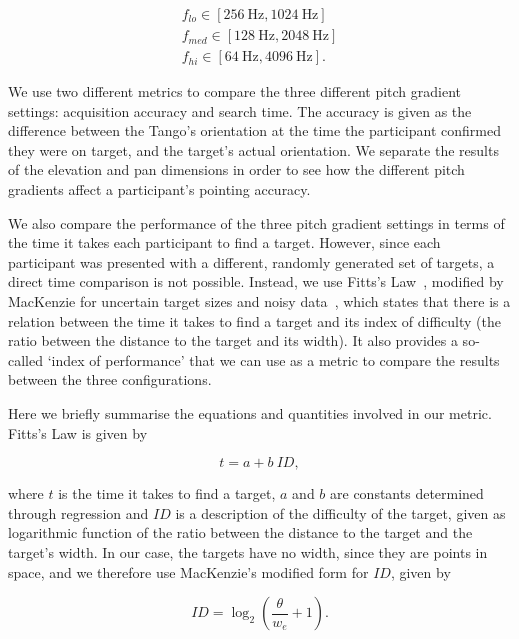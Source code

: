 \documentclass[acmsmall]{acmart}
\begin{document}
\begin{gather*}
  f_{lo}\in[\SI{256}{\hertz}, \SI{1024}{\hertz}]\\
  f_{med}\in[\SI{128}{\hertz}, \SI{2048}{\hertz}]\\
  f_{hi}\in[\SI{64}{\hertz}, \SI{4096}{\hertz}].
\end{gather*}

We use two different metrics to compare the three different pitch gradient settings: acquisition accuracy and search time.
The accuracy is given as the difference between the Tango's orientation at the time the participant confirmed they were on target, and the target's actual orientation.
We separate the results of the elevation and pan dimensions in order to see how the different pitch gradients affect a participant's pointing accuracy. 

We also compare the performance of the three pitch gradient settings in terms of the time it takes each participant to find a target.
However, since each participant was presented with a different, randomly generated set of targets, a direct time comparison is not possible.
Instead, we use Fitts's Law~\citep{fitts1954information}, modified by MacKenzie for uncertain target sizes and noisy data~\citep{mackenzie1992fitts}, which states that there is a relation between the time it takes to find a target and its index of difficulty (the ratio between the distance to the target and its width).
It also provides a so-called `index of performance' that we can use as a metric to compare the results between the three configurations. 

Here we briefly summarise the equations and quantities involved in our metric.
Fitts's Law is given by  

\begin{equation}
  \label{eq:fitts-base}
  t = a + b~ID,
\end{equation}

\noindent
where $t$ is the time it takes to find a target, $a$ and $b$ are constants determined through regression and $ID$ is a description of the difficulty of the target, given as logarithmic function of the ratio between the distance to the target and the target's width.
In our case, the targets have no width, since they are points in space, and we therefore use MacKenzie's modified form for $ID$, given by

\begin{equation}
  \label{eq:fitts-id}
  ID = \log_2\left(\frac{\theta}{w_e} + 1\right).
\end{equation}
\end{document}
